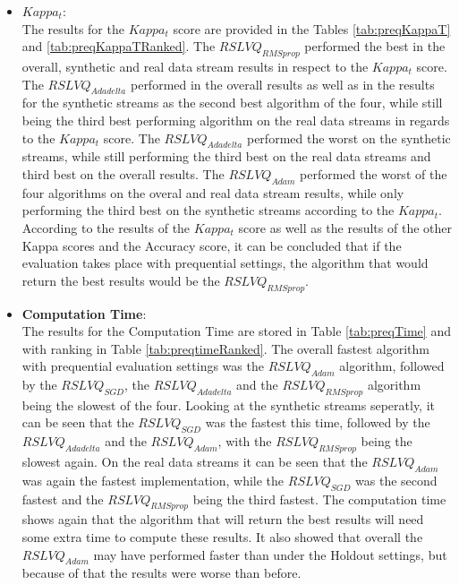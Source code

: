 \documentclass[12pt,oneside,a4paper,parskip]{scrbook}
\begin{document}
\begin{itemize}
  \item \textbf{$Kappa_t$}: \\
  The results for the $Kappa_t$ score are provided in the Tables \ref{tab:preqKappaT} and \ref{tab:preqKappaTRanked}.
  The $RSLVQ_\textit{RMSprop}$ performed the best in the overall, synthetic and real data stream results in respect to the
  $Kappa_t$ score. The $RSLVQ_\textit{Adadelta}$ performed in the overall results as well as in the results for the synthetic streams 
  as the second best algorithm of the four, while still being the third best performing algorithm on the real data streams in regards to 
  the $Kappa_t$ score. The $RSLVQ_\textit{Adadelta}$ performed the worst on the synthetic streams, while still performing the third best on 
  the real data streams and third best on the overall results.
  The $RSLVQ_\textit{Adam}$ performed the worst of the four algorithms on the overal and real data stream results, while only performing the third best
  on the synthetic streams according to the $Kappa_t$.
  According to the results of the $Kappa_t$ score as well as the results of the other Kappa scores and the Accuracy score, it can 
  be concluded that if the evaluation takes place with prequential settings, the algorithm that would return the best results would be the
  $RSLVQ_\textit{RMSprop}$.
  
  \item \textbf{Computation Time}: \\
  The results for the Computation Time are stored in Table \ref{tab:preqTime} and with ranking in Table \ref{tab:preqtimeRanked}.
  The overall fastest algorithm with prequential evaluation settings was the $RSLVQ_\textit{Adam}$ algorithm, followed by the 
  $RSLVQ_\textit{SGD}$, the $RSLVQ_\textit{Adadelta}$ and the $RSLVQ_\textit{RMSprop}$ algorithm being the slowest of the four.
  Looking at the synthetic streams seperatly, it can be seen that the $RSLVQ_\textit{SGD}$ was the fastest this time,
  followed by the $RSLVQ_\textit{Adadelta}$ and the $RSLVQ_\textit{Adam}$, with the $RSLVQ_\textit{RMSprop}$ being the slowest again.
  On the real data streams it can be seen that the $RSLVQ_\textit{Adam}$ was again the fastest implementation, while the $RSLVQ_\textit{SGD}$
  was the second fastest and the $RSLVQ_\textit{RMSprop}$ being the third fastest.
  The computation time shows again that the algorithm that will return the best results will need some extra time to compute
  these results.
  It also showed that overall the $RSLVQ_\textit{Adam}$ may have performed faster than under the Holdout settings, but because of that
  the results were worse than before.
  
\end{itemize}
\end{document}
